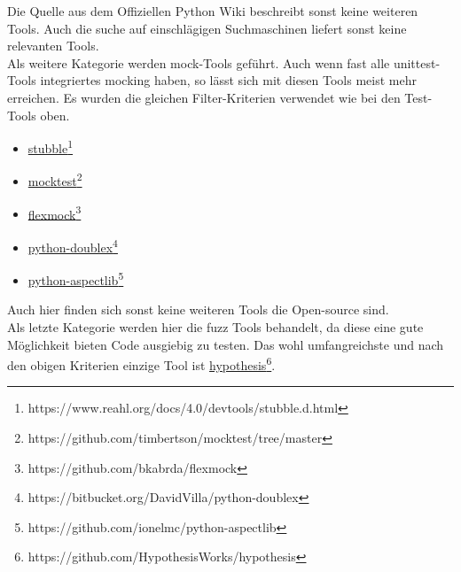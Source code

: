 Die Quelle aus dem Offiziellen Python Wiki beschreibt sonst keine weiteren Tools.
Auch die suche auf einschlägigen Suchmaschinen liefert sonst keine relevanten Tools.
\newline
\\
Als weitere Kategorie werden \Gls{mock}-Tools geführt. Auch wenn fast alle
unittest-Tools integriertes \gls{mock}ing haben, so lässt sich mit diesen
Tools meist mehr erreichen. Es wurden die gleichen Filter-Kriterien verwendet wie bei den
Test-Tools oben.
\begin{itemize}
    \item \href{https://www.reahl.org/docs/4.0/devtools/stubble.d.html}{stubble}\footnote{https://www.reahl.org/docs/4.0/devtools/stubble.d.html}
    \item \href{https://github.com/timbertson/mocktest/tree/master}{mocktest}\footnote{https://github.com/timbertson/mocktest/tree/master}
    \item \href{https://github.com/bkabrda/flexmock}{flexmock}\footnote{https://github.com/bkabrda/flexmock}
    \item \href{https://bitbucket.org/DavidVilla/python-doublex}{python-doublex}\footnote{https://bitbucket.org/DavidVilla/python-doublex}
    \item \href{https://github.com/ionelmc/python-aspectlib}{python-aspectlib}\footnote{https://github.com/ionelmc/python-aspectlib}
\end{itemize}
Auch hier finden sich sonst keine weiteren Tools die Open-source sind.
\newline
\\
Als letzte Kategorie werden hier die \Gls{fuzz} Tools behandelt, da diese eine
gute Möglichkeit bieten Code ausgiebig zu testen. Das wohl umfangreichste und nach den obigen Kriterien
einzige Tool ist \href{https://github.com/HypothesisWorks/hypothesis}{hypothesis}\footnote{https://github.com/HypothesisWorks/hypothesis}.

%



